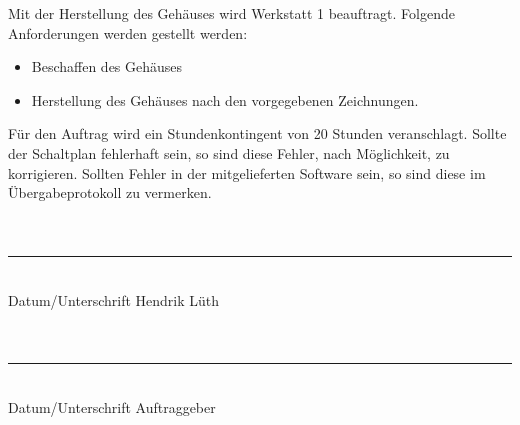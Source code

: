 \bigskip
Mit der Herstellung des Gehäuses wird Werkstatt 1 beauftragt. Folgende Anforderungen werden gestellt werden:\\
\begin{itemize}
\item Beschaffen des Gehäuses
\item Herstellung des Gehäuses nach den vorgegebenen Zeichnungen.
\end{itemize}
\bigskip
Für den Auftrag wird ein Stundenkontingent von 20 Stunden veranschlagt. Sollte der Schaltplan fehlerhaft sein, so sind diese Fehler, nach Möglichkeit, zu korrigieren. Sollten Fehler in der mitgelieferten Software sein, so sind diese im Übergabeprotokoll zu vermerken.\\
\bigskip \\
\bigskip \\
\rule{5cm}{0.5mm}\\
Datum/Unterschrift Hendrik Lüth\\
\bigskip \\
\bigskip \\
\rule{5cm}{0.5mm}\\
Datum/Unterschrift Auftraggeber


